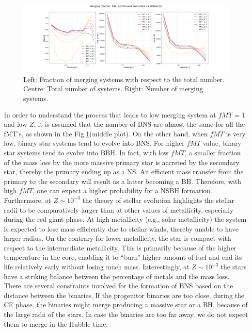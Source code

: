 \documentclass[preprint,12pt]{elsarticle}
\begin{document}
\begin{figure}[ht]
    \centering
    \includegraphics[width=1\textwidth]{Images/total_numerator_fraction (1).png}
    \caption{Left: Fraction of merging systems with respect to the total number. Centre: Total number of systems. Right: Number of merging systems.}
    \label{img:merging_vs_Z}
\end{figure}
In order to understand the process that leads to low merging system at $fMT$ = 1 and low $Z$, it is assumed that the number of BNS are almost the same for all the fMT's, as shown in the Fig.\ref{img:merging_vs_Z}(middle plot). On the other hand, when $fMT$ is very low, binary star systems tend to evolve into BNS. For higher $fMT$ value, binary star systems tend to evolve into BBH. In fact, with low $fMT$, a smaller fraction of the mass loss by the more massive primary star is accreted by the secondary star, thereby the primary ending up as a NS. An efficient mass transfer from the primary to the secondary will result as a latter becoming a BH. Therefore, with high $fMT$, one can expect a higher probability for a NSBH formation. Furthermore, at $Z \sim 10^{-3}$ the theory of stellar evolution highlights the stellar radii to be comparatively larger than at other values of metallicity, especially during the red giant phase. At high metallicity (e.g., solar metallicity) the system is expected to lose mass efficiently due to stellar winds, thereby unable to have larger radius. On the contrary for lower metallicity, the star is compact with respect to the intermediate metallicity. This is primarily because of the higher temperature in the core, enabling it to ``burn" higher amount of fuel and end its life relatively early without losing much mass. Interestingly, at $Z \sim 10^{-3}$ the stars have a striking balance between the percentage of metals and the mass loss. There are several constraints involved for the formation of BNS based on the distance between the binaries. If the progenitor binaries are too close, during the CE phase, the binaries might merge producing a massive star or a BH, because of the large radii of the stars. In case the binaries are too far away, we do not expect them to merge in the Hubble time.
\end{document}
